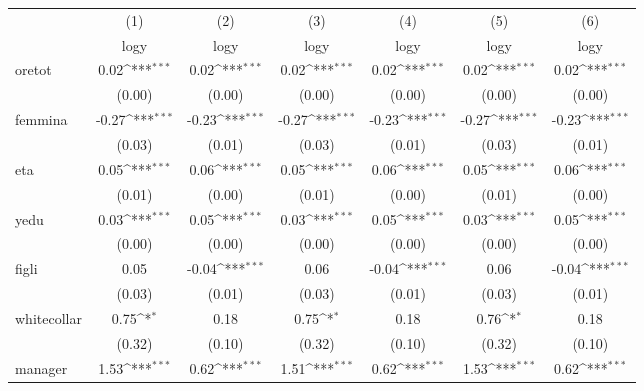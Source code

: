 {
\def\sym#1{\ifmmode^{#1}\else\(^{#1}\)\fi}
\begin{tabular}{l*{6}{c}}
\hline\hline
          &\multicolumn{1}{c}{(1)}&\multicolumn{1}{c}{(2)}&\multicolumn{1}{c}{(3)}&\multicolumn{1}{c}{(4)}&\multicolumn{1}{c}{(5)}&\multicolumn{1}{c}{(6)}\\
          &\multicolumn{1}{c}{logy}&\multicolumn{1}{c}{logy}&\multicolumn{1}{c}{logy}&\multicolumn{1}{c}{logy}&\multicolumn{1}{c}{logy}&\multicolumn{1}{c}{logy}\\
\hline
oretot    &     0.02\sym{***}&     0.02\sym{***}&     0.02\sym{***}&     0.02\sym{***}&     0.02\sym{***}&     0.02\sym{***}\\
          &   (0.00)         &   (0.00)         &   (0.00)         &   (0.00)         &   (0.00)         &   (0.00)         \\
[1em]
femmina   &    -0.27\sym{***}&    -0.23\sym{***}&    -0.27\sym{***}&    -0.23\sym{***}&    -0.27\sym{***}&    -0.23\sym{***}\\
          &   (0.03)         &   (0.01)         &   (0.03)         &   (0.01)         &   (0.03)         &   (0.01)         \\
[1em]
eta       &     0.05\sym{***}&     0.06\sym{***}&     0.05\sym{***}&     0.06\sym{***}&     0.05\sym{***}&     0.06\sym{***}\\
          &   (0.01)         &   (0.00)         &   (0.01)         &   (0.00)         &   (0.01)         &   (0.00)         \\
[1em]
yedu      &     0.03\sym{***}&     0.05\sym{***}&     0.03\sym{***}&     0.05\sym{***}&     0.03\sym{***}&     0.05\sym{***}\\
          &   (0.00)         &   (0.00)         &   (0.00)         &   (0.00)         &   (0.00)         &   (0.00)         \\
[1em]
figli     &     0.05         &    -0.04\sym{***}&     0.06         &    -0.04\sym{***}&     0.06         &    -0.04\sym{***}\\
          &   (0.03)         &   (0.01)         &   (0.03)         &   (0.01)         &   (0.03)         &   (0.01)         \\
[1em]
whitecollar&     0.75\sym{*}  &     0.18         &     0.75\sym{*}  &     0.18         &     0.76\sym{*}  &     0.18         \\
          &   (0.32)         &   (0.10)         &   (0.32)         &   (0.10)         &   (0.32)         &   (0.10)         \\
[1em]
manager   &     1.53\sym{***}&     0.62\sym{***}&     1.51\sym{***}&     0.62\sym{***}&     1.53\sym{***}&     0.62\sym{***}\\

\end{tabular}}
